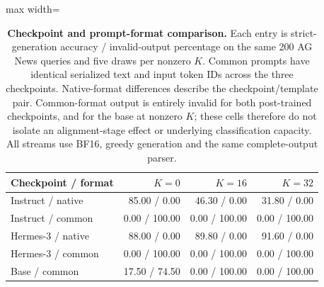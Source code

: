\begin{table}[p]
\centering\color{blue}
\caption{\textbf{Checkpoint and prompt-format comparison.} Each entry is strict-generation accuracy / invalid-output percentage on the same 200 AG News queries and five draws per nonzero $K$. Common prompts have identical serialized text and input token IDs across the three checkpoints. Native-format differences describe the checkpoint/template pair. Common-format output is entirely invalid for both post-trained checkpoints, and for the base at nonzero $K$; these cells therefore do not isolate an alignment-stage effect or underlying classification capacity. All streams use BF16, greedy generation and the same complete-output parser.}
\label{stab:final_formats}
\footnotesize
\begin{adjustbox}{max width=\textwidth}
\begin{tabular}{lrrr}
\toprule
Checkpoint / format & $K=0$ & $K=16$ & $K=32$ \\
\midrule
Instruct / native & 85.00 / 0.00 & 46.30 / 0.00 & 31.80 / 0.00 \\
Instruct / common & 0.00 / 100.00 & 0.00 / 100.00 & 0.00 / 100.00 \\
Hermes-3 / native & 88.00 / 0.00 & 89.80 / 0.00 & 91.60 / 0.00 \\
Hermes-3 / common & 0.00 / 100.00 & 0.00 / 100.00 & 0.00 / 100.00 \\
Base / common & 17.50 / 74.50 & 0.00 / 100.00 & 0.00 / 100.00 \\
\bottomrule
\end{tabular}
\end{adjustbox}
\end{table}

